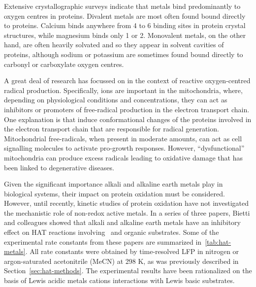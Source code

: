 \begin{doublespace}
Extensive crystallographic surveys indicate that metals bind predominantly to
oxygen centres in proteins.\cite{Harding1999, Harding2004, Hsin2008} Divalent
metals are most often found bound directly to proteins. Calcium binds anywhere
from 4 to 6 binding sites in protein crystal structures, while magnesium binds
only 1 or 2. Monovalent metals, on the other hand, are often heavily solvated
and so they appear in solvent cavities of proteins, although sodium or potassium
are sometimes found bound directly to carbonyl or carboxylate oxygen
centres.\cite{Harding2010}

A great deal of research has focussed on  in the context of reactive
oxygen-centred radical production.\cite{Goerlach2015} Specifically, 
ions are important in the mitochondria, where, depending on physiological
conditions and concentrations, they can act as inhibitors or promoters of
free-radical production in the electron transport chain.\cite{AdamVizi2010} One
explanation is that  induce conformational changes of the proteins
involved in the electron transport chain that are responsible for radical
generation.\cite{Brookes2004} Mitochondrial free-radicals, when present in
moderate amounts, can act as cell signalling molecules to activate pro-growth
responses.\cite{Sullivan2014} However, ``dysfunctional'' mitochondria can
produce excess radicals leading to oxidative damage that has been linked to
degenerative diseases.

Given the significant importance alkali and alkaline earth metals play in
biological systems, their impact on protein oxidation must be considered.
However, until recently, kinetic studies of protein oxidation have not
investigated the mechanistic role of non-redox active metals. In a series of
three papers,\cite{Salamone2013a, Salamone2015metals, Salamone2016} Bietti and
colleagues showed that alkali and alkaline earth metals have an inhibitory
effect on HAT reactions involving \cumo\ and organic substrates. Some of the
experimental rate constants from these papers are summarized
in~\ref{tab:hat-metals}. All rate constants were obtained by time-resolved LFP
in nitrogen or argon-saturated acetonitrile (MeCN) at 298 K, as was previously
described in Section~\ref{sec:hat-methods}. The experimental results have been
rationalized on the basis of Lewis acidic metals cations interactions with Lewis
basic substrates.



\end{doublespace}
